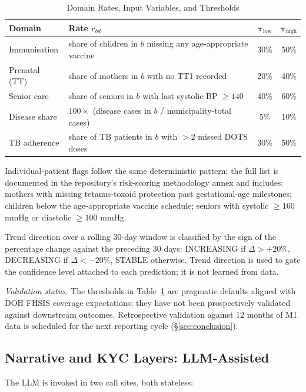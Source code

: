 \documentclass[conference]{IEEEtran}
\begin{document}
\begin{table}[!t]
\caption{Domain Rates, Input Variables, and Thresholds}
\label{tab:thresholds}
\centering
\begin{tabular}{|p{0.85in}|p{1.55in}|c|c|}
\hline
\textbf{Domain} & \textbf{Rate $r_{bd}$} & $\boldsymbol{\tau_{\mathrm{low}}}$ & $\boldsymbol{\tau_{\mathrm{high}}}$ \\
\hline
Immunisation & share of children in $b$ missing any age-appropriate vaccine & 30\% & 50\% \\
\hline
Prenatal (TT) & share of mothers in $b$ with no TT1 recorded & 20\% & 40\% \\
\hline
Senior care & share of seniors in $b$ with last systolic BP $\geq 140$ & 40\% & 60\% \\
\hline
Disease share & $100 \times$ (disease cases in $b$ / municipality-total cases) & 5\% & 10\% \\
\hline
TB adherence & share of TB patients in $b$ with $> 2$ missed DOTS doses & 30\% & 50\% \\
\hline
\end{tabular}
\end{table}

Individual-patient flags follow the same deterministic pattern; the full list is documented in the repository's risk-scoring methodology annex and includes: mothers with missing tetanus-toxoid protection past gestational-age milestones; children below the age-appropriate vaccine schedule; seniors with systolic $\geq 160$ mmHg or diastolic $\geq 100$ mmHg.

Trend direction over a rolling 30-day window is classified by the sign of the percentage change against the preceding 30 days: INCREASING if $\Delta > +20\%$, DECREASING if $\Delta < -20\%$, STABLE otherwise. Trend direction is used to gate the confidence level attached to each prediction; it is not learned from data.

\textit{Validation status.} The thresholds in Table~\ref{tab:thresholds} are pragmatic defaults aligned with DOH FHSIS coverage expectations; they have not been prospectively validated against downstream outcomes. Retrospective validation against 12 months of M1 data is scheduled for the next reporting cycle (\S\ref{sec:conclusion}).

\subsection{Narrative and KYC Layers: LLM-Assisted}
\label{sec:llmlayers}
The LLM is invoked in two call sites, both stateless:
\end{document}
